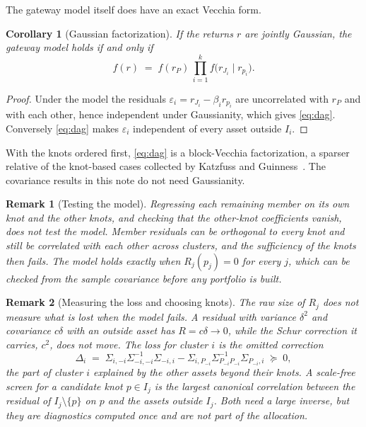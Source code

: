 \documentclass[11pt]{article}
\newtheorem{remark}{Remark}
\newtheorem{corollary}{Corollary}
\begin{document}
The gateway model itself does have an exact Vecchia form.

\begin{corollary}[Gaussian factorization]
\label{cor:gaussian}
If the returns $r$ are jointly Gaussian, the gateway model holds if and only
if
\begin{equation}
  f(r) \;=\; f(r_P)\,\prod_{i=1}^{k} f\big(r_{J_i}\mid r_{p_i}\big).
  \label{eq:dag}
\end{equation}
\end{corollary}

\begin{proof}
Under the model the residuals $\varepsilon_i=r_{J_i}-\beta_ir_{p_i}$ are
uncorrelated with $r_P$ and with each other, hence independent under
Gaussianity, which gives \eqref{eq:dag}. Conversely \eqref{eq:dag} makes
$\varepsilon_i$ independent of every asset outside $I_i$.
\end{proof}

With the knots ordered first, \eqref{eq:dag} is a block-Vecchia
factorization, a sparser relative of the knot-based cases collected by
Katzfuss and Guinness~\cite{katzfuss2021}. The covariance results in this note do not need
Gaussianity.

\begin{remark}[Testing the model]
Regressing each remaining member on its own knot and the other knots, and
checking that the other-knot coefficients vanish, does not test the model.
Member residuals can be orthogonal to every knot and still be correlated
with each other across clusters, and the sufficiency of the knots then
fails. The model holds exactly when $R_j(p_j)=0$ for every $j$, which can
be checked from the sample covariance before any portfolio is built.
\end{remark}

\begin{remark}[Measuring the loss and choosing knots]
The raw size of $R_j$ does not measure what is lost when the model fails. A
residual with variance $\delta^2$ and covariance $c\delta$ with an outside
asset has $R=c\delta\to0$, while the Schur correction it carries, $c^2$,
does not move. The loss for cluster $i$ is the omitted correction
\begin{equation}
  \Delta_i \;=\; \Sigma_{i,-i}\Sigma_{-i,-i}^{-1}\Sigma_{-i,i}
   -\Sigma_{i,P_{-i}}\Sigma_{P_{-i}P_{-i}}^{-1}\Sigma_{P_{-i},i}
  \;\succeq\; 0,
  \label{eq:loss}
\end{equation}
the part of cluster $i$ explained by the other assets beyond their knots.
A scale-free screen for a candidate knot $p\in I_j$ is the largest canonical
correlation between the residual of $I_j\setminus\{p\}$ on $p$ and the
assets outside $I_j$. Both need a large inverse, but they are diagnostics
computed once and are not part of the allocation.
\end{remark}
\end{document}
